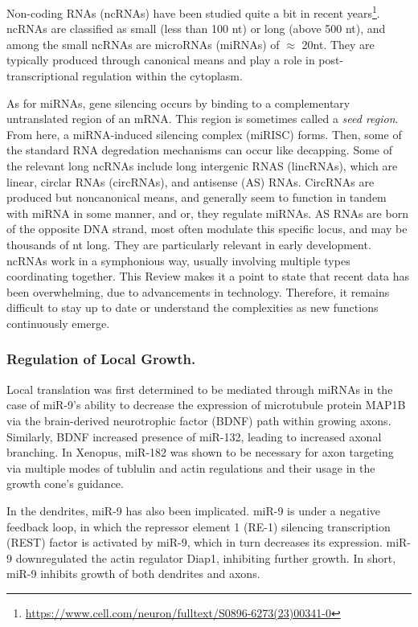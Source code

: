 \documentclass[12pt]{report}
\begin{document}
Non-coding RNAs (ncRNAs) have been studied quite a bit in recent years\footnote{\url{https://www.cell.com/neuron/fulltext/S0896-6273(23)00341-0}}. ncRNAs are classified as small (less than 100 nt) or long (above 500 nt), and among the small ncRNAs are microRNAs (miRNAs) of $\approx$ 20nt. They are typically produced through canonical means and play a role in post-transcriptional regulation within the cytoplasm.\newline

As for miRNAs, gene silencing occurs by binding to a complementary untranslated region of an mRNA. This region is sometimes called a \textit{seed region}. From here, a miRNA-induced silencing complex (miRISC) forms. Then, some of the standard RNA degredation mechanisms can occur like decapping. Some of the relevant long ncRNAs include long intergenic RNAS (lincRNAs), which are linear, circlar RNAs (circRNAs), and antisense (AS) RNAs. CircRNAs are produced but noncanonical means, and generally seem to function in tandem with miRNA in some manner, and or, they regulate miRNAs. AS RNAs are born of the opposite DNA strand, most often modulate this specific locus, and may be thousands of nt long. They are particularly relevant in early development. ncRNAs work in a symphonious way, usually involving multiple types coordinating together. This Review makes it a point to state that recent data has been overwhelming, due to advancements in technology. Therefore, it remains difficult to stay up to date or understand the complexities as new functions continuously emerge.

\subsubsection{Regulation of Local Growth.}

Local translation was first determined to be mediated through miRNAs in the case of miR-9's ability to decrease the expression of microtubule protein MAP1B via the brain-derived neurotrophic factor (BDNF) path within growing axons. Similarly, BDNF increased presence of miR-132, leading to increased axonal branching. In Xenopus, miR-182 was shown to be necessary for axon targeting via multiple modes of tublulin and actin regulations and their usage in the growth cone's guidance.\newline

In the dendrites, miR-9 has also been implicated. miR-9 is under a negative feedback loop, in which the repressor element 1 (RE-1) silencing transcription (REST) factor is activated by miR-9, which in turn decreases its expression. miR-9 downregulated the actin regulator Diap1, inhibiting further growth. In short, miR-9 inhibits growth of both dendrites and axons.\newline
\end{document}
